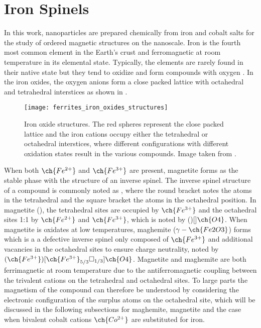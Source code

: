 \documentclass[\main/dresen_thesis.tex]{subfiles}
\begin{document}
  \section{Iron Spinels}
  In this work, nanoparticles are prepared chemically from iron and cobalt salts for the study of ordered magnetic structures on the nanoscale.
  Iron is the fourth most common element in the Earth's crust and ferromagnetic at room temperature in its elemental state.
  Typically, the elements are rarely found in their native state but they tend to oxidize and form compounds with oxygen \cite{Parkinson_2016_Irono}.
  In the iron oxides, the oxygen anions  form a close packed lattice with octahedral and tetrahedral interstices as shown in .
  \begin{figure}[b]
    \centering
    \texttt{[image: ferrites\_iron\_oxides\_structures]}
    \caption{\label{fig:theoreticalBackground:ferrites:ironOxides}Iron oxide structures. The red spheres represent the close packed  lattice and the iron cations occupy either the tetrahedral or octahedral interstices, where different configurations with different oxidation states result in the various compounds. Image taken from  \cite{Parkinson_2016_Irono}.}
  \end{figure}

  When both $\ch{Fe^{2+}}$ and $\ch{Fe^{3+}}$ are present, magnetite forms as the stable phase with the structure of an inverse spinel.
  The inverse spinel structure of a compound  is commonly noted as , where the round bracket notes the atoms in the tetrahedral and the square bracket the atoms in the octahedral position.
  In magnetite (), the tetrahedral sites are occupied by $\ch{Fe^{3+}}$ and the octahedral sites 1:1 by $\ch{Fe^{2+}}$ and $\ch{Fe^{3+}}$, which is noted by ()[]$\ch{O4}$. When magnetite is oxidates at low temperatures, maghemite ($\gamma-\ch{Fe2O3}$) forms which is a a defective inverse spinel only composed of $\ch{Fe^{3+}}$ and additional vacancies in the octahedral sites to ensure charge neutrality, noted by $(\ch{Fe^{3+}})[\ch{Fe^{3+}}_{5/3}\square_{1/3}]\ch{O4}$.
  Magnetite and maghemite are both ferrimagnetic at room temperature due to the antiferromagnetic coupling between the trivalent cations on the tetrahedral and octahedral sites.
  To large parts the magnetism of the compound can therefore be understood by considering the electronic configuration of the surplus atoms on the octahedral site, which will be discussed in the following subsections for maghemite, magnetite and the case when bivalent cobalt cations $\ch{Co^{2+}}$ are substituted for iron.
\end{document}
